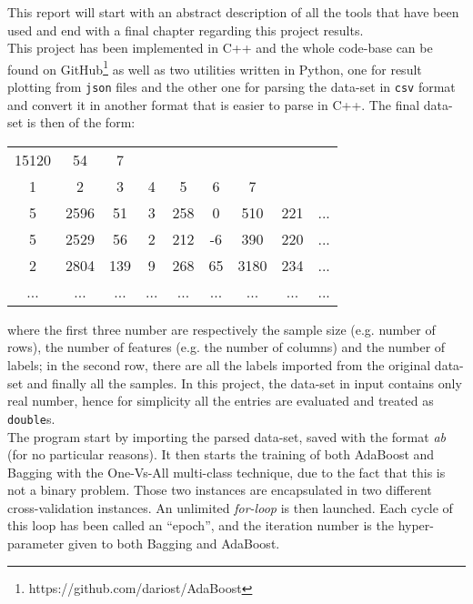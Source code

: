 This report will start with an abstract description of all the tools that have been used and end with a final chapter regarding this project results.\\
This project has been implemented in C++ and the whole code-base can be found on GitHub\footnote{https://github.com/dariost/AdaBoost} as well as two utilities written in Python, one for result plotting from \texttt{json} files and the other one for parsing the data-set in \texttt{csv} format and convert it in another format that is easier to parse in C++. The final data-set is then of the form:
\begin{center}
\begin{tabular}{ccccccccc}
	15120 & 54 & 7 &  &  &  &  &  &  \\ 
	1 & 2 & 3 & 4 & 5 & 6 & 7 &  &  \\ 
	5 & 2596 & 51 & 3 & 258 & 0 & 510 & 221 & ... \\
	5 & 2529 & 56 & 2 & 212 & -6 & 390 & 220 & ... \\
	2 & 2804 & 139 & 9 & 268 & 65 & 3180 & 234 & ... \\
	... & ... & ... & ... & ... & ... & ... & ... & ... \\
\end{tabular}
\end{center} 
where the first three number are respectively the sample size (e.g. number of rows), the number of features (e.g. the number of columns) and the number of labels; in the second row, there are all the labels imported from the original data-set and finally all the samples. In this project, the data-set in input contains only real number, hence for simplicity all the entries are evaluated and treated as \texttt{double}s.\\
The program start by importing the parsed data-set, saved with the format \textit{ab} (for no particular reasons). It then starts the training of both AdaBoost and Bagging with the One-Vs-All multi-class technique, due to the fact that this is not a binary problem. Those two instances are encapsulated in two different cross-validation instances. An unlimited \textit{for-loop} is then launched. Each cycle of this loop has been called an ``epoch'', and the iteration number is the hyper-parameter given to both Bagging and AdaBoost.
